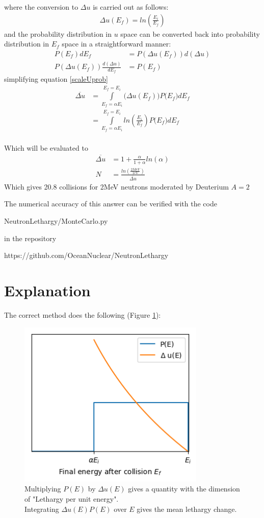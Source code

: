 \documentclass[a4paper, 12pt]{article}
\begin{document}
where the conversion to $\Delta u$ is carried out as follows:
\begin{align}
	\Delta u (E_f) = ln\left(\frac{E_i}{E_f} \right)
\end{align}
and the probability distribution in $u$ space can be converted back into probability distribution in $E_f$ space in a straightforward manner:
\begin{align}
	P(E_f) dE_f &= P(\Delta u (E_f) ) {d(\Delta u)}	\\
	P(\Delta u (E_f) ) \frac{d(\Delta u)}{dE_f} &= P(E_f)
\end{align}
simplifying equation \ref{scaleUprob}
\begin{align}
	\overline{\Delta u} &=	\int\limits_{E_f=\alpha E_i}^{E_f=E_i} \big(\Delta u (E_f) \big) P\big(E_f \big) dE_f	\\
						&=	\int\limits_{E_f=\alpha E_i}^{E_f=E_i} ln \left( \frac{E_i}{E_f} \right) P\big(E_f \big) dE_f \\
\end{align}

Which will be evaluated to
\begin{align}
	\overline{\Delta u} &=	1+\frac{\alpha}{1+\alpha} ln(\alpha)	\\
	N &= \frac{ ln \left( \frac{2 MeV}{1eV} \right)} { \overline{\Delta u} }
\end{align}
Which gives 20.8 collisions for 2MeV neutrons moderated by Deuterium $A=2$

The numerical accuracy of this answer can be verified with the code

NeutronLethargy/MonteCarlo.py

in the repository 

https://github.com/OceanNuclear/NeutronLethargy

\section{Explanation}
	The correct method does the following (Figure \ref{Fig1}):
	
	\begin{figure}[!h]
	\centering
	\includegraphics[height=8cm]{Fig1.png}
	\caption{Multiplying $P(E)$ by $\Delta u(E)$ gives a quantity with the dimension of "Lethargy per unit energy".\\
	Integrating $\Delta u(E) P(E)$ over $E$ gives the mean lethargy change.}\label{Fig1}
	\end{figure}
\end{document}
